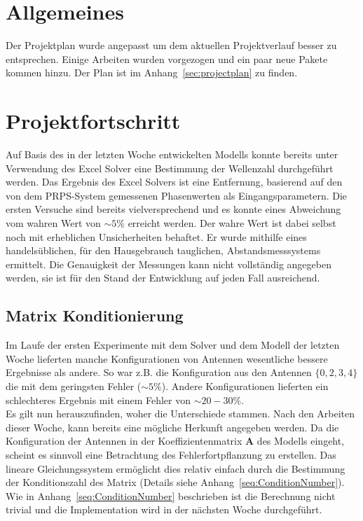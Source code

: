 \documentclass[a4paper,12pt,fleqn]{article}
\begin{document}
\setlength{\headheight}{36pt}

\begin{titlepage}



\end{titlepage}

\section[Allgemeines]{Allgemeines}
Der Projektplan wurde angepasst um dem aktuellen Projektverlauf besser zu entsprechen. Einige Arbeiten wurden vorgezogen und ein paar neue Pakete kommen hinzu. Der Plan ist im Anhang~\ref{sec:projectplan} zu finden.
%
\section[Fortschritt]{Projektfortschritt}
Auf Basis des in der letzten Woche entwickelten Modells konnte bereits unter Verwendung des Excel Solver eine Bestimmung der Wellenzahl durchgeführt werden. Das Ergebnis des Excel Solvers ist eine Entfernung, basierend auf den von dem PRPS-System gemessenen Phasenwerten als Eingangsparametern. Die ersten Versuche sind bereits vielversprechend und es konnte eines Abweichung vom wahren Wert von $\sim5\%$ erreicht werden. Der wahre Wert ist dabei selbst noch mit erheblichen Unsicherheiten behaftet. Er wurde mithilfe eines handelsüblichen, für den Hausgebrauch tauglichen, Abstandsmesssystems ermittelt. Die Genauigkeit der Messungen kann nicht vollständig angegeben werden, sie ist für den Stand der Entwicklung auf jeden Fall ausreichend.
%
\subsection{Matrix Konditionierung}
Im Laufe der ersten Experimente mit dem Solver und dem Modell der letzten Woche lieferten manche Konfigurationen von Antennen wesentliche bessere Ergebnisse als andere. So war z.B. die Konfiguration aus den Antennen $\{0,2,3,4\}$ die mit dem geringsten Fehler ($\sim5\%$). Andere Konfigurationen lieferten ein schlechteres Ergebnis mit einem Fehler von $\sim20-30\%$.\\
Es gilt nun herauszufinden, woher die Unterschiede stammen. Nach den Arbeiten dieser Woche, kann bereits eine mögliche Herkunft angegeben werden. Da die Konfiguration der Antennen in der Koeffizientenmatrix $\mathbf{A}$ des Modells eingeht, scheint es sinnvoll eine Betrachtung des Fehlerfortpflanzung zu erstellen. Das lineare Gleichungssystem ermöglicht dies relativ einfach durch die Bestimmung der Konditionszahl des Matrix (Details siehe Anhang~\ref{seq:ConditionNumber}).\\
Wie in Anhang~\ref{seq:ConditionNumber} beschrieben ist die Berechnung nicht trivial und die Implementation wird in der nächsten Woche durchgeführt.
%
\end{document}
